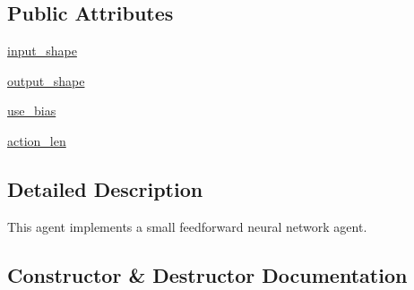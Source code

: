 \subsection*{Public Attributes}
\begin{DoxyCompactItemize}
\item 
\hyperlink{classtaxons_1_1core_1_1evolution_1_1agents_1_1_f_f_neural_agent_a80c9405db212739cbd1d87a22937fe32}{input\+\_\+shape}
\item 
\hyperlink{classtaxons_1_1core_1_1evolution_1_1agents_1_1_f_f_neural_agent_acb240f0be94cdcf367a52ad574ef73ba}{output\+\_\+shape}
\item 
\hyperlink{classtaxons_1_1core_1_1evolution_1_1agents_1_1_f_f_neural_agent_ac411d0381853dcd7c5cab6e96c5118f0}{use\+\_\+bias}
\item 
\hyperlink{classtaxons_1_1core_1_1evolution_1_1agents_1_1_f_f_neural_agent_a10abdcb12eb671dcf75eb57b9583059e}{action\+\_\+len}
\end{DoxyCompactItemize}


\subsection{Detailed Description}
\begin{DoxyVerb}This agent implements a small feedforward neural network agent.
\end{DoxyVerb}
 

\subsection{Constructor \& Destructor Documentation}
